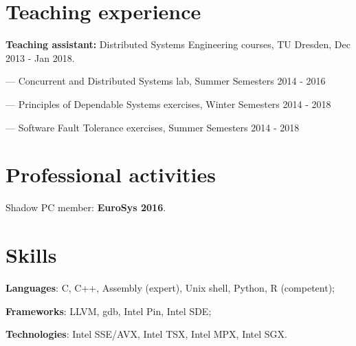 \documentclass[letterpaper]{article}
\renewenvironment{itemize}{
  \begin{list}{}{
    \setlength{\leftmargin}{1.5em}
  }
}{
  \end{list}
}
\begin{document}
\section*{Teaching experience}

\begin{itemize}
\item {\bf Teaching assistant:} Distributed Systems Engineering courses, TU Dresden, Dec 2013 - Jan 2018.
\begin{itemize}
	\item --- Concurrent and Distributed Systems lab, Summer Semesters 2014 - 2016 
	\item --- Principles of Dependable Systems exercises, Winter Semesters 2014 - 2018
	\item --- Software Fault Tolerance exercises, Summer Semesters 2014 - 2018
\end{itemize}
\end{itemize}


\section*{Professional activities}


\begin{itemize}
 \item { Shadow PC member:} {\bf EuroSys 2016}.
\end{itemize}
  




\section*{Skills}
\begin{itemize}
	\item {\bf Languages}: C, C++, Assembly (expert), Unix shell, Python, R (competent);
	\item {\bf Frameworks}: LLVM, gdb, Intel Pin, Intel SDE;
	\item {\bf Technologies}: Intel SSE/AVX, Intel TSX, Intel MPX, Intel SGX.
\end{itemize}
\end{document}
